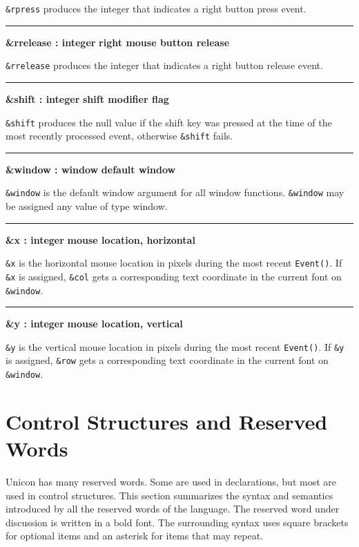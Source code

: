 \noindent
\texttt{\&rpress} produces the integer that indicates a right button
press event.

\bigskip\hrule\vspace{0.1cm}
\noindent
{\bf \&rrelease : integer } \hfill {\bf right mouse button release}

\noindent
\texttt{\&rrelease} produces the integer that indicates a right button
release event.

\bigskip\hrule\vspace{0.1cm}
\noindent
{\bf \&shift : integer } \hfill {\bf shift modifier flag}

\noindent
\texttt{\&shift} produces the null value if the shift key was pressed at
the time of the most recently processed event, otherwise
\texttt{\&shift} fails.

\bigskip\hrule\vspace{0.1cm}
\noindent
{\bf \&window : window } \hfill {\bf default window}

\noindent
\texttt{\&window} is the default window argument for all window
functions. \texttt{\&window} may be assigned any value of type
window.

\bigskip\hrule\vspace{0.1cm}
\noindent
{\bf \&x : integer } \hfill {\bf mouse location, horizontal}

\noindent
\texttt{\&x} is the horizontal mouse location in pixels during the most
recent \texttt{Event()}. If \texttt{\&x} is assigned, \texttt{\&col}
gets a corresponding text coordinate in the current font on
\texttt{\&window}.

\bigskip\hrule\vspace{0.1cm}
\noindent
{\bf \&y : integer } \hfill {\bf mouse location, vertical}

\noindent
\texttt{\&y} is the vertical mouse location in pixels during the most
recent \texttt{Event()}. If \texttt{\&y} is assigned, \texttt{\&row}
gets a corresponding text coordinate in the current font on
\texttt{\&window}.

\section{Control Structures and Reserved Words}

Unicon has many reserved words. Some are used in
declarations, but most are used in control
structures. This section summarizes the syntax and semantics
introduced by all the reserved words of the language. The reserved
word under discussion is written in a bold font. The surrounding
syntax uses square brackets for optional items and an asterisk for
items that may repeat.

